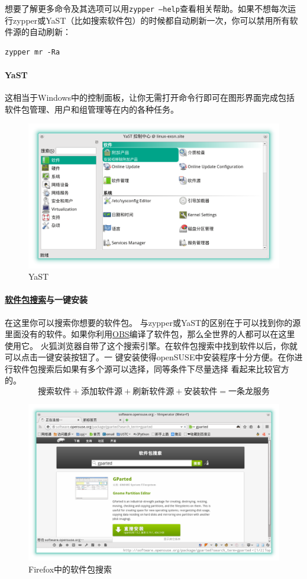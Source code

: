 \documentclass[11pt,openany]{book}
\newcommand{\command}[1]{\texttt{\textcolor{codec}{#1}}}
\newcommand{\zy}{zypper或YaST}
\begin{document}
想要了解更多命令及其选项可以用\command{zypper --help}查看相关帮助。如果不想每次运行\zy （比如搜索软件包）的时候都自动刷新一次，你可以禁用所有软件源的自动刷新：
\begin{Verbatim}[formatcom=\color{codec}]
    zypper mr -Ra
\end{Verbatim}

\paragraph{YaST} 这相当于Windows中的控制面板，让你无需打开命令行即可在图形界面完成包括软件包管理、用户和组管理等在内的各种任务。
\begin{figure}[htb]
\centering
\includegraphics[width=\textwidth]{./pic/yast.png} 
\caption{YaST}\label{yast}
\end{figure}
\paragraph[软件包搜索与一键安装]{\href{http://software.opensuse.org/packages}{软件包搜索}与一键安装} 在这里你可以搜索你想要的软件包。
与\zy 的区别在于可以找到你的源里面没有的软件。如果你利用\href{https://build.opensuse.org/}{OBS}编译了软件包，那么全世界的人都可以在这里使用它。
火狐浏览器自带了这个搜索引擎。在软件包搜索中找到软件以后，你就可以点击一键安装按钮了。一
键安装使得openSUSE中安装程序十分方便。在你进行软件包搜索后如果有多个源可以选择，同等条件下尽量选择
看起来比较官方的。\[\text{搜索软件}+\text{添加软件源}+\text{刷新软件源}+\text{安装软件}=\text{一条龙服务}\]
\begin{figure}[htb]
\centering
\includegraphics[width=\textwidth]{./pic/software.png} 
\caption{Firefox中的软件包搜索}\label{soft}
\end{figure}
\end{document}

